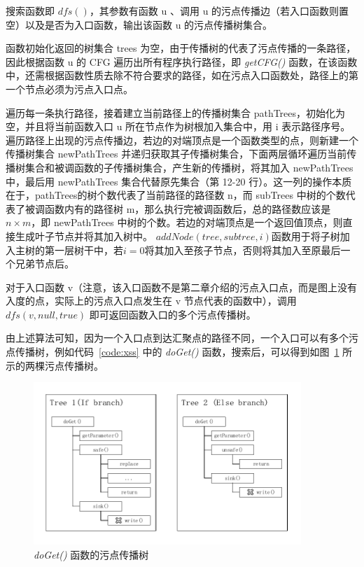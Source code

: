 搜索函数即 $dfs()$，其参数有函数 u 、调用 u 的污点传播边（若入口函数则置空）以及是否为入口函数，输出该函数 u 的污点传播树集合。

函数初始化返回的树集合 trees 为空，由于传播树的代表了污点传播的一条路径，因此根据函数 u 的 CFG 遍历出所有程序执行路径，即 \textit{getCFG()} 函数，在该函数中，还需根据函数性质去除不符合要求的路径，如在污点入口函数处，路径上的第一个节点必须为污点入口点。

遍历每一条执行路径，接着建立当前路径上的传播树集合 pathTrees，初始化为空，并且将当前函数入口 u 所在节点作为树根加入集合中，用 i 表示路径序号。遍历路径上出现的污点传播边，若边的对端顶点是一个函数类型的点，则新建一个传播树集合 newPathTrees 并递归获取其子传播树集合，下面两层循环遍历当前传播树集合和被调函数的子传播树集合，产生新的传播树，将其加入 newPathTrees 中，最后用 newPathTrees 集合代替原先集合（第 12-20 行）。这一列的操作本质在于，pathTrees的树个数代表了当前路径的路径数 n，而 subTrees 中树的个数代表了被调函数内有的路径树 m，那么执行完被调函数后，总的路径数应该是 $n \times m$，即 newPathTrees 中树的个数。若边的对端顶点是一个返回值顶点，则直接生成叶子节点并将其加入树中。
$addNode(tree, subtree, i)$函数用于将子树加入主树的第一层树干中，若$i=0$将其加入至孩子节点，否则将其加入至原最后一个兄弟节点后。

对于入口函数 v（注意，该入口函数不是第二章介绍的污点入口点，而是图上没有入度的点，实际上的污点入口点发生在 v 节点代表的函数中），调用$dfs(v, null,true)$ 即可返回函数入口的多个污点传播树。

由上述算法可知，因为一个入口点到达汇聚点的路径不同，一个入口可以有多个污点传播树，例如代码~\ref{code:xss} 中的 \textit{doGet()} 函数，搜索后，可以得到如图~\ref{taintTree} 所示的两棵污点传播树。

\begin{figure}[!htb]
    \centering
    \includegraphics[width=0.9\textwidth]{FIGs/chapter4/taintTree.pdf}
    \caption{\textit{doGet()} 函数的污点传播树}\label{taintTree}
\end{figure}


